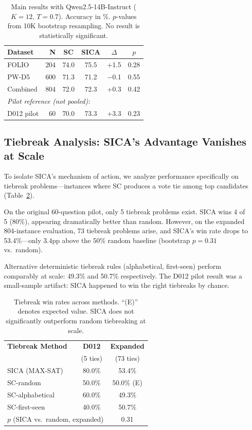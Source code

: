 \documentclass[11pt,a4paper]{article}
\begin{document}
\begin{table}[t]
\centering
\small
\begin{tabular}{lrcccc}
\toprule
\textbf{Dataset} & \textbf{N} & \textbf{SC} & \textbf{SICA} & \textbf{$\Delta$} & \textbf{$p$} \\
\midrule
FOLIO & 204 & 74.0 & 75.5 & +1.5 & 0.28 \\
PW-D5 & 600 & 71.3 & 71.2 & $-$0.1 & 0.55 \\
\midrule
Combined & 804 & 72.0 & 72.3 & +0.3 & 0.42 \\
\midrule
\multicolumn{6}{l}{\emph{Pilot reference (not pooled):}} \\
D012 pilot & 60 & 70.0 & 73.3 & +3.3 & 0.23 \\
\bottomrule
\end{tabular}
\caption{Main results with Qwen2.5-14B-Instruct ($K=12$, $T=0.7$). Accuracy in \%. $p$-values from 10K bootstrap resampling. No result is statistically significant.}
\label{tab:main}
\end{table}

\subsection{Tiebreak Analysis: SICA's Advantage Vanishes at Scale}
\label{sec:tiebreak}

To isolate SICA's mechanism of action, we analyze performance specifically on tiebreak problems---instances where SC produces a vote tie among top candidates (Table~\ref{tab:tiebreak}).

On the original 60-question pilot, only 5 tiebreak problems exist.
SICA wins 4 of 5 (80\%), appearing dramatically better than random.
However, on the expanded 804-instance evaluation, 73 tiebreak problems arise, and SICA's win rate drops to 53.4\%---only 3.4pp above the 50\% random baseline (bootstrap $p=0.31$ vs.\ random).

Alternative deterministic tiebreak rules (alphabetical, first-seen) perform comparably at scale: 49.3\% and 50.7\% respectively.
The D012 pilot result was a small-sample artifact: SICA happened to win the right tiebreaks by chance.

\begin{table}[t]
\centering
\small
\begin{tabular}{lcc}
\toprule
\textbf{Tiebreak Method} & \textbf{D012} & \textbf{Expanded} \\
 & (5 ties) & (73 ties) \\
\midrule
SICA (MAX-SAT) & 80.0\% & 53.4\% \\
SC-random & 50.0\% & 50.0\% (E) \\
SC-alphabetical & 60.0\% & 49.3\% \\
SC-first-seen & 40.0\% & 50.7\% \\
\midrule
\multicolumn{2}{l}{$p$ (SICA vs.\ random, expanded)} & 0.31 \\
\bottomrule
\end{tabular}
\caption{Tiebreak win rates across methods. ``(E)'' denotes expected value. SICA does not significantly outperform random tiebreaking at scale.}
\label{tab:tiebreak}
\end{table}
\end{document}
